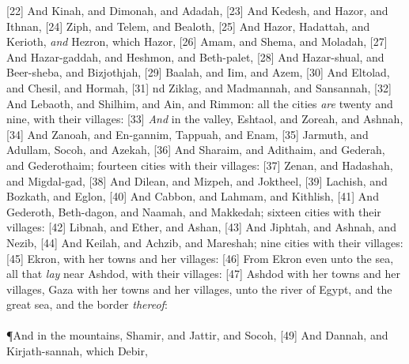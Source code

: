 [22] \textcolor[cmyk]{0.99998,1,0,0}{And Kinah, and Dimonah, and Adadah,}
[23] \textcolor[cmyk]{0.99998,1,0,0}{And Kedesh, and Hazor, and Ithnan,}
[24] \textcolor[cmyk]{0.99998,1,0,0}{Ziph, and Telem, and Bealoth,}
[25] \textcolor[cmyk]{0.99998,1,0,0}{And Hazor, Hadattah, and Kerioth, \emph{and} Hezron, which   Hazor,}
[26] \textcolor[cmyk]{0.99998,1,0,0}{Amam, and Shema, and Moladah,}
[27] \textcolor[cmyk]{0.99998,1,0,0}{And Hazar-gaddah, and Heshmon, and Beth-palet,}
[28] \textcolor[cmyk]{0.99998,1,0,0}{And Hazar-shual, and Beer-sheba, and Bizjothjah,}
[29] \textcolor[cmyk]{0.99998,1,0,0}{Baalah, and Iim, and Azem,}
[30] \textcolor[cmyk]{0.99998,1,0,0}{And Eltolad, and Chesil, and Hormah,}
[31] \textcolor[cmyk]{0.99998,1,0,0}{nd Ziklag, and Madmannah, and Sansannah,}
[32] \textcolor[cmyk]{0.99998,1,0,0}{And Lebaoth, and Shilhim, and Ain, and Rimmon: all the cities \emph{are} twenty and nine, with their villages:}
[33] \textcolor[cmyk]{0.99998,1,0,0}{\emph{And} in the valley, Eshtaol, and Zoreah, and Ashnah,}
[34] \textcolor[cmyk]{0.99998,1,0,0}{And Zanoah, and En-gannim, Tappuah, and Enam,}
[35] \textcolor[cmyk]{0.99998,1,0,0}{Jarmuth, and Adullam, Socoh, and Azekah,}
[36] \textcolor[cmyk]{0.99998,1,0,0}{And Sharaim, and Adithaim, and Gederah, and Gederothaim; fourteen cities with their villages:}
[37] \textcolor[cmyk]{0.99998,1,0,0}{Zenan, and Hadashah, and Migdal-gad,}
[38] \textcolor[cmyk]{0.99998,1,0,0}{And Dilean, and Mizpeh, and Joktheel,}
[39] \textcolor[cmyk]{0.99998,1,0,0}{Lachish, and Bozkath, and Eglon,}
[40] \textcolor[cmyk]{0.99998,1,0,0}{And Cabbon, and Lahmam, and Kithlish,}
[41] \textcolor[cmyk]{0.99998,1,0,0}{And Gederoth, Beth-dagon, and Naamah, and Makkedah; sixteen cities with their villages:}
[42] \textcolor[cmyk]{0.99998,1,0,0}{Libnah, and Ether, and Ashan,}
[43] \textcolor[cmyk]{0.99998,1,0,0}{And Jiphtah, and Ashnah, and Nezib,}
[44] \textcolor[cmyk]{0.99998,1,0,0}{And Keilah, and Achzib, and Mareshah; nine cities with their villages:}
[45] \textcolor[cmyk]{0.99998,1,0,0}{Ekron, with her towns and her villages:}
[46] \textcolor[cmyk]{0.99998,1,0,0}{From Ekron even unto the sea, all that \emph{lay} near Ashdod, with their villages:}
[47] \textcolor[cmyk]{0.99998,1,0,0}{Ashdod with her towns and her villages, Gaza with her towns and her villages, unto the river of Egypt, and the great sea, and the border \emph{thereof}:}\\
\\
\P \textcolor[cmyk]{0.99998,1,0,0}{And in the mountains, Shamir, and Jattir, and Socoh,}
[49] \textcolor[cmyk]{0.99998,1,0,0}{And Dannah, and Kirjath-sannah, which   Debir,}
